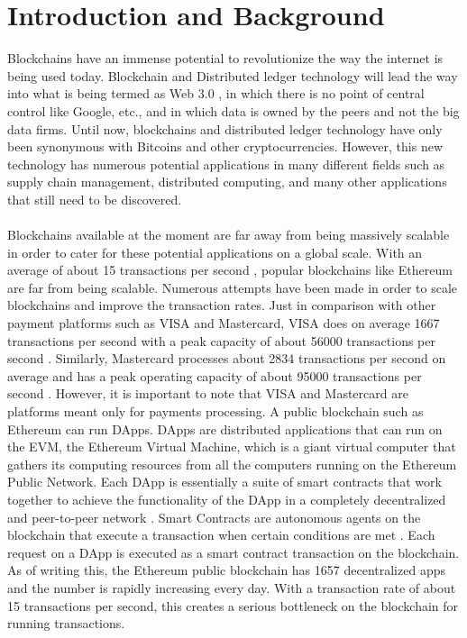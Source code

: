 \documentclass[a4paper,twoside,phd]{BYUPhys}
\begin{document}
\section{Introduction and Background}
Blockchains have an immense potential to revolutionize the way the internet is being used today. Blockchain and Distributed ledger technology will lead the way into what is being termed as Web 3.0 \cite{MatteoGianpietroZago2018WhyIt}, in which there is no point of central control like Google, etc., and in which data is owned by the peers and not the big data firms. Until now, blockchains and distributed ledger technology have only been synonymous with Bitcoins and other cryptocurrencies. However, this new technology has numerous potential applications in many different fields such as supply chain management, distributed computing, and many other applications that still need to be discovered.
\\
\\
Blockchains available at the moment are far away from being massively scalable in order to cater for these potential applications on a global scale. With an average of about 15 transactions per second \cite{AlyssaHertig2018HowCoinDesk}, popular blockchains like Ethereum are far from being scalable. Numerous attempts have been made in order to scale blockchains and improve the transaction rates. Just in comparison with other payment platforms such as VISA and Mastercard, VISA does on average 1667 transactions per second with a peak capacity of about 56000 transactions per second \cite{2018BitcoinToday}. Similarly, Mastercard processes about 2834 transactions per second on average and has a peak operating capacity of about 95000 transactions per second \cite{TheIssuers}. However, it is important to note that VISA and Mastercard are platforms meant only for payments processing. A public blockchain such as Ethereum can run DApps. DApps are distributed applications that can run on the EVM, the Ethereum Virtual Machine, which is a giant virtual computer that gathers its computing resources from all the computers running on the Ethereum Public Network. Each DApp is essentially a suite of smart contracts that work together to achieve the functionality of the DApp in a completely decentralized and peer-to-peer network \cite{2018StatePOA}. Smart Contracts are autonomous agents on the blockchain that execute a transaction when certain conditions are met \cite{ButerinAPLATFORM}. Each request on a DApp is executed as a smart contract transaction on the blockchain. As of writing this, the Ethereum public blockchain has 1657 decentralized apps and the number is rapidly increasing every day. With a transaction rate of about 15 transactions per second, this creates a serious bottleneck on the blockchain for running transactions.
\end{document}
